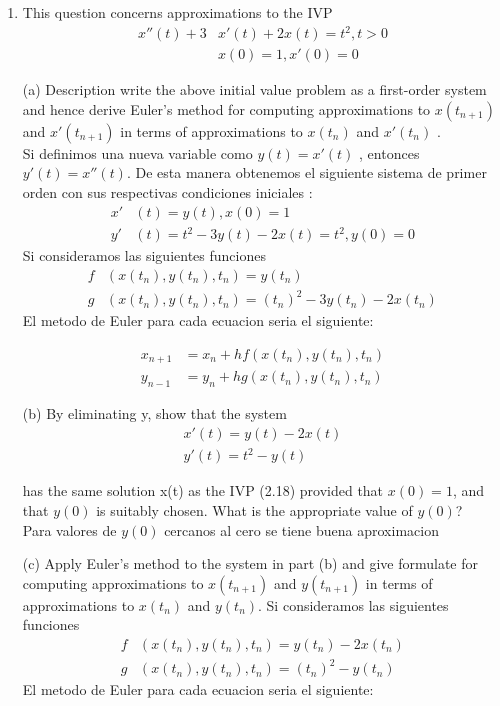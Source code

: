 \begin{enumerate}
 	\item
 	This question concerns approximations to the IVP
 	  \begin{align*}
 	     x''(t) + 3&x'(t) + 2x(t) = t^{2} , t > 0 \\
 	     &x(0) = 1, x'(0) = 0
 	  \end{align*}
 	\item[(a)]
 	Description write the above initial value problem as a first-order system
 	and hence derive Euler’s method for computing approximations to $x(t_{n+1})$ 
 	and $x'(t_{n+1})$ in terms of approximations to $x(t_n)$ and $x'(t_n)$ .\\
 	Si definimos una nueva variable como $y(t) = x'(t)$ , entonces $y'(t) = x''(t)$.
 	De esta manera obtenemos el siguiente sistema de primer orden con sus respectivas condiciones
 	iniciales :
 	 \begin{align*}
 	 x'&(t) = y(t),   x(0) = 1 \\
 	 y'&(t) = t^2 - 3y(t) - 2x(t) = t^{2} , y(0) = 0 
 	 \end{align*}
 	 	Si consideramos las siguientes funciones\\
 	 	\begin{align*}
 	 	f&(x(t_n), y(t_n), t_n) = y(t_n) \\
 	 	g&(x(t_n), y(t_n), t_n) = (t_n)^2 - 3y(t_n) - 2x(t_n)
 	 	\end{align*}
 	 	El metodo de Euler para cada ecuacion seria el siguiente:
 	 	
 	 	\begin{align*}
 	 	x_{n+1} &= x_n + hf(x(t_n), y(t_n), t_n) \\
 	 	y_{n-1} &= y_n + hg(x(t_n), y(t_n), t_n)   
 	 	\end{align*}	
 	 	
 	
 	\item[(b)]
 	By eliminating y, show that the system
 	  \begin{align*}
 		x'(t) = y(t) - 2x(t) \\
 		y'(t) = t^2 - y(t) 
 	  \end{align*}
 	  
 	has the same solution x(t) as the IVP (2.18) provided that
 	$x(0) = 1$, and that $y(0)$ is suitably chosen. What is the appropriate value of $y(0)$?\\
 	
 	Para valores de $y(0)$ cercanos al cero se tiene buena aproximacion\\
 	
 	\item[(c)]
 	Apply Euler’s method to the system in part (b) and give formulate for computing 
 	approximations to $x(t_{n+1})$ and $y(t_{n+1})$ in terms of approximations to $x(t_n)$ and $y(t_n)$.
 		 	Si consideramos las siguientes funciones\\
 		 	\begin{align*}
 		 	f&(x(t_n), y(t_n), t_n) = y(t_n) - 2x(t_n) \\
 		 	g&(x(t_n), y(t_n), t_n) = (t_n)^2 - y(t_n) 
 		 	\end{align*}
 		 	El metodo de Euler para cada ecuacion seria el siguiente:
 		 	

\end{enumerate}

